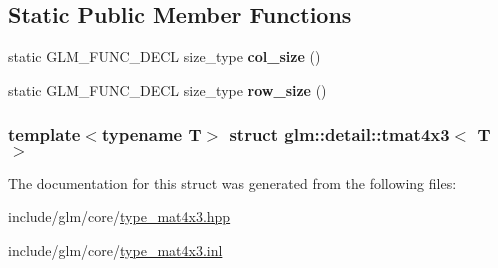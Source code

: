 \subsection*{\-Static \-Public \-Member \-Functions}
\begin{DoxyCompactItemize}
\item 
\hypertarget{structglm_1_1detail_1_1tmat4x3_a4d265b380e0ffcd9c22160ec0aa0174f}{static \-G\-L\-M\-\_\-\-F\-U\-N\-C\-\_\-\-D\-E\-C\-L size\-\_\-type {\bfseries col\-\_\-size} ()}\label{structglm_1_1detail_1_1tmat4x3_a4d265b380e0ffcd9c22160ec0aa0174f}

\item 
\hypertarget{structglm_1_1detail_1_1tmat4x3_a43233b7dcbaaf896a036ca122d5e084e}{static \-G\-L\-M\-\_\-\-F\-U\-N\-C\-\_\-\-D\-E\-C\-L size\-\_\-type {\bfseries row\-\_\-size} ()}\label{structglm_1_1detail_1_1tmat4x3_a43233b7dcbaaf896a036ca122d5e084e}

\end{DoxyCompactItemize}
\subsubsection*{template$<$typename \-T$>$ struct glm\-::detail\-::tmat4x3$<$ T $>$}



\-The documentation for this struct was generated from the following files\-:\begin{DoxyCompactItemize}
\item 
include/glm/core/\hyperlink{type__mat4x3_8hpp}{type\-\_\-mat4x3.\-hpp}\item 
include/glm/core/\hyperlink{type__mat4x3_8inl}{type\-\_\-mat4x3.\-inl}\end{DoxyCompactItemize}

